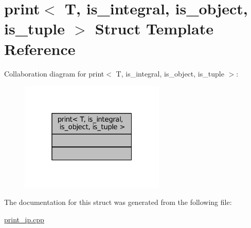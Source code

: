 \hypertarget{structprint}{}\section{print$<$ T, is\+\_\+integral, is\+\_\+object, is\+\_\+tuple $>$ Struct Template Reference}
\label{structprint}


Collaboration diagram for print$<$ T, is\+\_\+integral, is\+\_\+object, is\+\_\+tuple $>$\+:
\nopagebreak
\begin{figure}[H]
\begin{center}
\leavevmode
\includegraphics[width=196pt]{structprint__coll__graph}
\end{center}
\end{figure}


The documentation for this struct was generated from the following file\+:\begin{DoxyCompactItemize}
\item 
\hyperlink{print__ip_8cpp}{print\+\_\+ip.\+cpp}\end{DoxyCompactItemize}
